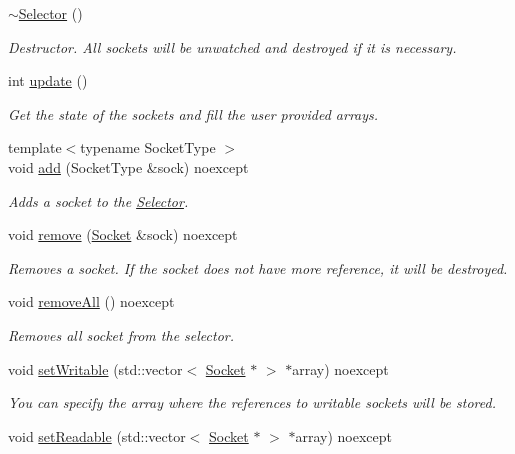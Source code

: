 \begin{DoxyCompactItemize}
\hyperlink{classtnnf_1_1_selector_a6042ab1f47fabf155e3d553f5915cb20}{$\sim$\+Selector} ()
\begin{DoxyCompactList}\small\item\em Destructor. All sockets will be unwatched and destroyed if it is necessary. \end{DoxyCompactList}\item 
int \hyperlink{classtnnf_1_1_selector_a56fd12ff21981124269b5bd5088af35e}{update} ()
\begin{DoxyCompactList}\small\item\em Get the state of the sockets and fill the user provided arrays. \end{DoxyCompactList}\item 
{\footnotesize template$<$typename Socket\+Type $>$ }\\void \hyperlink{classtnnf_1_1_selector_a439ee1a5d523971b0e534d33e3949fcb}{add} (Socket\+Type \&sock) noexcept
\begin{DoxyCompactList}\small\item\em Adds a socket to the \hyperlink{classtnnf_1_1_selector}{Selector}. \end{DoxyCompactList}\item 
void \hyperlink{classtnnf_1_1_selector_a72c6a0be81609137a5642651fd2e2538}{remove} (\hyperlink{classtnnf_1_1_socket}{Socket} \&sock) noexcept
\begin{DoxyCompactList}\small\item\em Removes a socket. If the socket does not have more reference, it will be destroyed. \end{DoxyCompactList}\item 
void \hyperlink{classtnnf_1_1_selector_a28f6afe65d89053cd3975210885f7650}{remove\+All} () noexcept
\begin{DoxyCompactList}\small\item\em Removes all socket from the selector. \end{DoxyCompactList}\item 
void \hyperlink{classtnnf_1_1_selector_a93a5ec8731ffc17f5f82c76471479f51}{set\+Writable} (std\+::vector$<$ \hyperlink{classtnnf_1_1_socket}{Socket} $\ast$ $>$ $\ast$array) noexcept
\begin{DoxyCompactList}\small\item\em You can specify the array where the references to writable sockets will be stored. \end{DoxyCompactList}\item 
void \hyperlink{classtnnf_1_1_selector_add3b3f0bc48901bc1630d93187e2147b}{set\+Readable} (std\+::vector$<$ \hyperlink{classtnnf_1_1_socket}{Socket} $\ast$ $>$ $\ast$array) noexcept

\end{DoxyCompactItemize}
